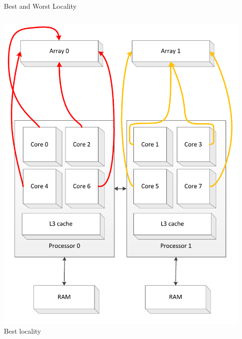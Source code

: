 \begin{frame}{Best and Worst Locality}
  \begin{columns}[c]
    \begin{column}{0.50\textwidth}
      \begin{center}
        \includegraphics[width=\textwidth]{figures/cache-stress-test-mafushi-threads-best} \\
        \tiny{Best locality}     
      \end{center}
    \end{column}
    \begin{column}{0.50\textwidth}
      \begin{center}

\end{center}
\end{column}
\end{columns}
\end{frame}

